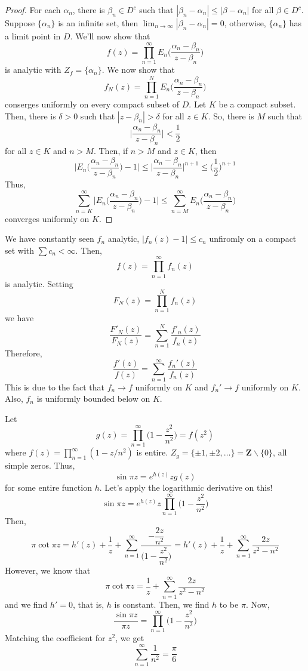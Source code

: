 \begin{proof}
For each $\alpha _{n}$, there is $\beta _{n}\in D^{c}$ such that $|\beta _{n}-\alpha _{n}|\leq |\beta -\alpha _{n}|$ for all $\beta \in D^{c}$. Suppose $\{\alpha _{n}\}$ is an infinite set, then $\lim _{n\rightarrow \infty }|\beta _{n}-\alpha _{n}|=0$, otherwise, $\{\alpha _{n}\}$ has a limit point in $D$. We'll now show that
\[f(z)=\prod^{\infty }_{n=1}E_{n}\Big(\dfrac{\alpha _{n}-\beta _{n}}{z-\beta _{n}}\Big)\]
is analytic with $Z_{f}=\{\alpha _{n}\}$. We now show that 
\[f_{N}(z)=\prod^{N}_{n=1}E_{n}\Big(\dfrac{\alpha _{n}-\beta _{n}}{z-\beta _{n}}\Big)\]
conserges uniformly on every compact subset of $D$. Let $K$ be a compact subset. Then, there is $\delta >0$ such that $|z-\beta _{n}|>\delta $ for all $z\in K$. So, there is $M$ such that 
\[\Big|\dfrac{\alpha _{n}-\beta _{n}}{z-\beta _{n}}\Big|<\dfrac{1}{2}\]
for all $z\in K$ and $n>M$. Then, if $n>M$ and $z\in K$, then
\[\Big|E_{n}\Big(\dfrac{\alpha _{n}-\beta _{n}}{z-\beta _{n}}\Big)-1\Big|\leq \Big|\dfrac{\alpha _{n}-\beta _{n}}{z-\beta _{n}}\Big|^{n+1}\leq \Big(\dfrac{1}{2}\Big)^{n+1}\]
Thus,
\[\sum ^{\infty }_{n=K}\Big|E_{n}\Big(\dfrac{\alpha _{n}-\beta _{n}}{z-\beta _{n}}\Big)-1\Big|\leq \sum ^{\infty }_{n=M}E_{n}\Big(\dfrac{\alpha _{n}-\beta _{n}}{z-\beta _{n}}\Big)\]
converges uniformly on $K$.
\end{proof}
\vspace{2ex}
\begin{lem}
We have constantly seen $f_{n}$ analytic, $|f_{n}(z)-1|\leq c_{n}$ unfiromly on a compact set with $\sum c_{n}<\infty $. Then,\[f(z)=\prod^{\infty }_{n=1}f_{n}(z)\]
is analytic. Setting
\[F_{N}(z)=\prod^{N}_{n=1}f_{n}(z)\]
we have
\[\dfrac{F'_{N}(z)}{F_{N}(z)}=\sum ^{N}_{n=1}\dfrac{f'_{n}(z)}{f_{n}(z)}\]
Therefore,
\[\dfrac{f'(z)}{f(z)}=\sum _{n=1}^{\infty }\dfrac{f_{n}'(z)}{f_{n}(z)}\]
This is due to the fact that $f_{n}\rightarrow f$ uniformly on $K$ and $f_{n}'\rightarrow f$ uniformly on $K$. Also, $f_{n}$ is uniformly bounded below on $K$. 
\end{lem}
\vspace{2ex}
\begin{ex}
Let 
\[g(z)=\prod^{\infty }_{n=1}\Big(1-\dfrac{z^2}{n^2}\Big)=f(z^2)\]
where $f(z)=\prod^{\infty }_{n=1}(1-z/n^2)$ is entire. $Z_{g}=\{\pm 1,\pm 2,\ldots \}={\bm Z}\backslash\{0\}$, all simple zeros. Thus,
\[\sin \pi z=e^{h(z)}zg(z)\]
for some entire function $h$. Let's apply the logarithmic derivative on this!
\[\sin \pi z=e^{h(z)}z\prod^{\infty }_{n=1}\Big(1-\dfrac{z^2}{n^2}\Big)\]
Then,
\[\pi \cot \pi z=h'(z)+\dfrac{1}{z}+\sum ^{\infty }_{n=1}\dfrac{-\dfrac{2z}{n^2}}{\Big(1-\dfrac{z^2}{n^2}\Big)}=h'(z)+\dfrac{1}{z}+\sum^{\infty }_{n=1}\dfrac{2z}{z^2-n^2}\]
However, we know that
\[\pi \cot \pi z=\dfrac{1}{z}+\sum ^{\infty }_{n=1}\dfrac{2z}{z^2-n^2}\]
and we find $h'=0$, that is, $h$ is constant. Then, we find $h$ to be $\pi $. Now,\[\dfrac{\sin \pi z}{\pi z}=\prod^{\infty }_{n=1}\Big(1-\dfrac{z^2}{n^2}\Big)\]
Matching the coefficient for $z^2$, we get
\[\sum ^{\infty }_{n=1}\dfrac{1}{n^2}=\dfrac{\pi }{6}\]
\end{ex}
